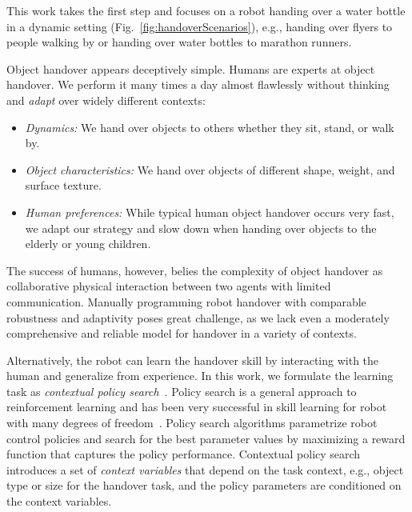 This work takes the first step and focuses on a robot handing over a water bottle in a dynamic setting  (Fig.~\ref{fig:handoverScenarios}), e.g., handing over flyers to people walking by or handing over  water bottles to marathon runners.

Object handover appears deceptively simple. Humans are experts at object handover. We perform it many times a day almost flawlessly without thinking and \emph{adapt} over widely different contexts:

\begin{itemize}
\item \emph{Dynamics:} We hand over objects to others whether they sit, stand, or walk by.
\item \emph{Object characteristics:} We hand over objects of different shape, weight, and surface texture.
\item \emph{Human preferences:} While typical human  object handover occurs very fast, we adapt our strategy and slow down when handing over objects to the elderly or young children.
\end{itemize}

The success of humans, however, belies the complexity of object handover as collaborative  physical interaction between two agents with limited communication.  Manually programming robot handover with comparable robustness and adaptivity poses great challenge, as we lack even a moderately comprehensive and reliable  model for handover in a variety of contexts.

Alternatively, the robot can learn the handover skill by interacting with the human and generalize from experience.  In this work, we formulate the learning task as \emph{contextual policy search}~\citep{Kupcsik2013}. Policy search is a general approach to reinforcement learning and has been very successful in skill learning for robot with many degrees of freedom~\citep{Deisenroth2013}. Policy search algorithms parametrize robot control policies and search for the best parameter values by maximizing a reward function that captures the policy performance.  Contextual policy search introduces a set of \emph{context
variables} that depend on the task context, e.g., object type or size for the handover task, and the policy parameters are conditioned on the context variables.

